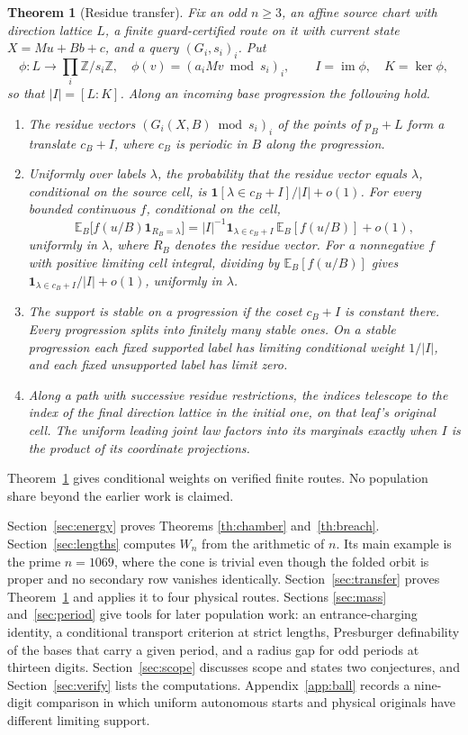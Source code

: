 \documentclass[11pt,reqno]{amsart}
\newtheorem{theorem}{Theorem}
\theoremstyle{definition}
\newcommand{\Z}{\mathbb Z}
\begin{document}
\begin{theorem}[Residue transfer]\label{th:transfer}
Fix an odd \(n\ge3\), an affine source chart with direction lattice \(L\), a finite guard-certified route on it with current state \(X=Mu+Bb+c\), and a query \((G_i,s_i)_i\). Put
\[
 \phi:L\longrightarrow\textstyle\prod_i\Z/s_i\Z,\quad \phi(v)=(a_iMv\bmod s_i)_i,
 \qquad I=\operatorname{im}\phi,\quad K=\ker\phi,
\]
so that \(|I|=[L:K]\). Along an incoming base progression the following hold.
\begin{enumerate}
\item The residue vectors \((G_i(X,B)\bmod s_i)_i\) of the points of \(p_B+L\) form a translate \(c_B+I\), where \(c_B\) is periodic in \(B\) along the progression.
\item Uniformly over labels \(\lambda\), the probability that the residue vector equals \(\lambda\), conditional on the source cell, is \(\mathbf 1[\lambda\in c_B+I]/|I|+o(1)\). For every bounded continuous \(f\), conditional on the cell,
\[
 \mathbb E_B\big[f(u/B)\mathbf 1_{R_B=\lambda}\big]=|I|^{-1}\mathbf 1_{\lambda\in c_B+I}\,\mathbb E_B[f(u/B)]+o(1),
\]
uniformly in \(\lambda\), where \(R_B\) denotes the residue vector. For a nonnegative \(f\) with positive limiting cell integral, dividing by \(\mathbb E_B[f(u/B)]\) gives \(\mathbf 1_{\lambda\in c_B+I}/|I|+o(1)\), uniformly in \(\lambda\).
\item The support is \emph{stable} on a progression if the coset \(c_B+I\) is constant there. Every progression splits into finitely many stable ones. On a stable progression each fixed supported label has limiting conditional weight \(1/|I|\), and each fixed unsupported label has limit zero.
\item Along a path with successive residue restrictions, the indices telescope to the index of the final direction lattice in the initial one, on that leaf's original cell. The uniform leading joint law factors into its marginals exactly when \(I\) is the product of its coordinate projections.
\end{enumerate}
\end{theorem}

Theorem~\ref{th:transfer} gives conditional weights on verified finite routes. No population share beyond the earlier work \cite{G9} is claimed.

Section~\ref{sec:energy} proves Theorems \ref{th:chamber} and~\ref{th:breach}. Section~\ref{sec:lengths} computes \(W_n\) from the arithmetic of \(n\). Its main example is the prime \(n=1069\), where the cone is trivial even though the folded orbit is proper and no secondary row vanishes identically. Section~\ref{sec:transfer} proves Theorem~\ref{th:transfer} and applies it to four physical routes. Sections \ref{sec:mass} and~\ref{sec:period} give tools for later population work: an entrance-charging identity, a conditional transport criterion at strict lengths, Presburger definability of the bases that carry a given period, and a radius gap for odd periods at thirteen digits. Section~\ref{sec:scope} discusses scope and states two conjectures, and Section~\ref{sec:verify} lists the computations. Appendix~\ref{app:ball} records a nine-digit comparison in which uniform autonomous starts and physical originals have different limiting support.
\end{document}

